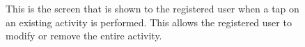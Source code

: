 \documentclass[12pt,titlepage]{article}
\begin{document}
\begin{figure}
\centering
{}
\caption{This is the screen that is shown to the registered user when a tap on an existing activity is performed. This allows the registered user to modify or remove the entire activity. }
\end{figure}
\clearpage
\newpage
\end{document}
